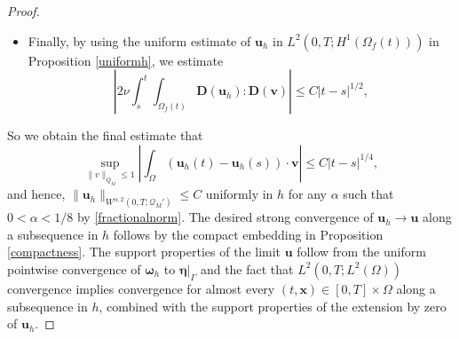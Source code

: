 \documentclass[11pt]{article}
\newcommand{\bd}{\boldsymbol}
\theoremstyle{definition}
\begin{document}
\begin{proof}
\begin{itemize}
\begin{multline*}
\end{multline*}
since $\hat{\bd{u}}_{h}$ is uniformly bounded in $L^{\infty}(0, T; L^{2}(\Omega_{f})) \cap L^{2}(0, T; H^{1}(\Omega_{f}))$ and hence also in $L^{8/3}(0, T; H^{3/4}(\Omega_{f}))$ by Proposition \ref{tracehuniform}. Similarly, by the uniform bound of $p_{h}$ in $L^{2}(0, T; H^{1}(\Omega_{b}))$ given in Proposition \ref{uniformh},
\begin{equation*}
\left|\int_{s}^{t} \int_{\Gamma(t)} \left(\frac{1}{2}|\bd{u}_{h}|^{2} - p_{h}\right) (\bd{v} \cdot \bd{n})\right| \le C\int_{s}^{t} \left(\|p_{h}\|_{L^{2}(\Gamma)} + \|\bd{u}_{h}\|_{L^{4}(\Gamma)}^{2}\right) \le C|t - s|^{1/4},
\end{equation*}
and by using the uniform bound of $\bd{\zeta}_{h}$ in $L^{2}(0, T; H^{k}(\Gamma))$ for all positive integers $k$ given in Proposition \ref{uniformh}, 
\begin{align*}
\left|\int_{s}^{t} \int_{\Gamma(t)} (\bd{\zeta}_{h} - \bd{u}_{h}) \cdot \bd{\tau} (\bd{v} \cdot \bd{\tau})\right| &\le C\int_{s}^{t} \left(\|\bd{\zeta}_{h}\|_{L^{2}(\Gamma)} + \|\bd{u}_{h}\|_{L^{2}(\Gamma)}\right) \\
&\le C\int_{s}^{t} \left(\|\bd{\zeta}_{h}\|_{L^{2}(\Gamma)} + \|\bd{u}_{h}\|_{H^{1}(\Gamma)}\right) \le C|t - s|^{1/2}.
\end{align*}
\item Finally, by using the uniform estimate of $\bd{u}_{h}$ in $L^{2}(0, T; H^{1}(\Omega_{f}(t)))$ in Proposition \ref{uniformh}, we estimate
\begin{equation*}
\left|2\nu \int_{s}^{t} \int_{\Omega_{f}(t)} \bd{D}(\bd{u}_{h}) : \bd{D}(\bd{v})\right| \le C|t - s|^{1/2},
\end{equation*}
\end{itemize}
So we obtain the final estimate that
\begin{equation*}
\sup_{\|v\|_{Q_{M}} \le 1} \left|\int_{\Omega} (\bd{u}_{h}(t) - \bd{u}_{h}(s)) \cdot \bd{v}\right| \le C|t - s|^{1/4},
\end{equation*}
and hence, $\|\bd{u}_{h}\|_{W^{\alpha, 2}(0, T; \mathcal{Q}_{M}')} \le C$ uniformly in $h$ for any $\alpha$ such that $0 < \alpha < 1/8$ by \eqref{fractionalnorm}. The desired strong convergence of $\bd{u}_{h} \to \bd{u}$ along a subsequence in $h$ follows by the compact embedding in Proposition \ref{compactness}. The support properties of the limit $\bd{u}$ follow from the uniform pointwise convergence of $\bd{\omega}_{h}$ to $\bd{\eta}|_{\Gamma}$ and the fact that $L^{2}(0, T; L^{2}(\Omega))$ convergence implies convergence for almost every $(t, \bd{x}) \in [0, T] \times \Omega$ along a subsequence in $h$, combined with the support properties of the extension by zero of $\bd{u}_{h}$. 
\end{proof}
\end{document}
